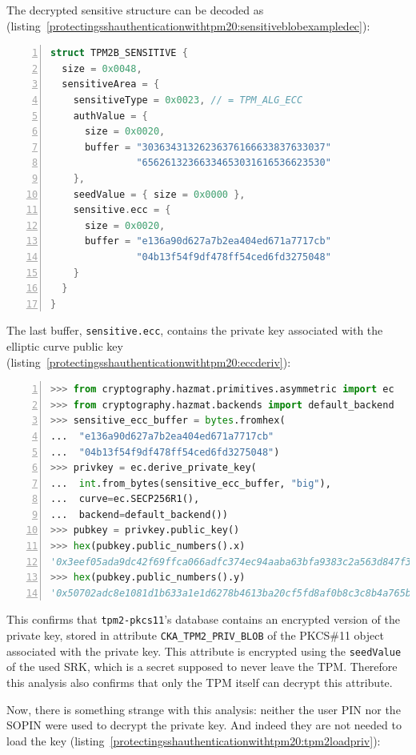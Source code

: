 The decrypted sensitive structure can be decoded as
(listing~\ref{protectingsshauthenticationwithtpm20:sensitiveblobexampledec}):

\begin{lstlisting}[language=C, numbers=left, caption={Deserialization of the decryption of a generated private key blob}, label=protectingsshauthenticationwithtpm20:sensitiveblobexampledec]
struct TPM2B_SENSITIVE {
  size = 0x0048,
  sensitiveArea = {
    sensitiveType = 0x0023, // = TPM_ALG_ECC
    authValue = {
      size = 0x0020,
      buffer = "30363431326236376166633837633037"
               "65626132366334653031616536623530"
    },
    seedValue = { size = 0x0000 },
    sensitive.ecc = {
      size = 0x0020,
      buffer = "e136a90d627a7b2ea404ed671a7717cb"
               "04b13f54f9df478ff54ced6fd3275048"
    }
  }
}
\end{lstlisting}

The last buffer, \texttt{sensitive.ecc}, contains the
private key associated with the elliptic curve public key
(listing~\ref{protectingsshauthenticationwithtpm20:eccderiv}):

\begin{lstlisting}[language=Python, numbers=left, caption={Python session which computes the public key associated with the recovered private key}, label=protectingsshauthenticationwithtpm20:eccderiv]
>>> from cryptography.hazmat.primitives.asymmetric import ec
>>> from cryptography.hazmat.backends import default_backend
>>> sensitive_ecc_buffer = bytes.fromhex(
...  "e136a90d627a7b2ea404ed671a7717cb"
...  "04b13f54f9df478ff54ced6fd3275048")
>>> privkey = ec.derive_private_key(
...  int.from_bytes(sensitive_ecc_buffer, "big"),
...  curve=ec.SECP256R1(),
...  backend=default_backend())
>>> pubkey = privkey.public_key()
>>> hex(pubkey.public_numbers().x)
'0x3eef05ada9dc42f69ffca066adfc374ec94aaba63bfa9383c2a563d847f31ac2'
>>> hex(pubkey.public_numbers().y)
'0x50702adc8e1081d1b633a1e1d6278b4613ba20cf5fd8af0b8c3c8b4a765b9387'
\end{lstlisting}

This confirms that \texttt{tpm2-pkcs11}'s database
contains an encrypted version of the private key, stored in attribute
\texttt{CKA\_TPM2\_PRIV\_BLOB} of the PKCS\#11 object
associated with the private key. This attribute is encrypted using the
\texttt{seedValue} of the used SRK, which is a secret
supposed to never leave the TPM. Therefore this analysis also confirms
that only the TPM itself can decrypt this attribute.

Now, there is something strange with this analysis: neither the user PIN
nor the SOPIN were used to decrypt the private key. And indeed they are
not needed to load the key
(listing~\ref{protectingsshauthenticationwithtpm20:tpm2loadpriv}):

